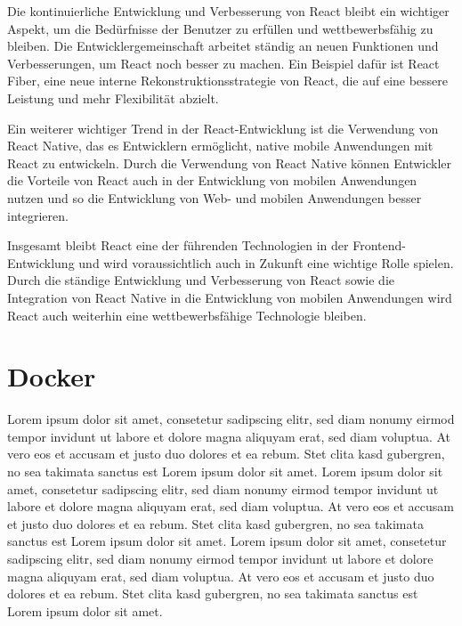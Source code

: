 Die kontinuierliche Entwicklung und Verbesserung von React bleibt ein wichtiger Aspekt, um die Bedürfnisse der Benutzer zu erfüllen und wettbewerbsfähig zu bleiben. Die Entwicklergemeinschaft arbeitet ständig an neuen Funktionen und Verbesserungen, um React noch besser zu machen. Ein Beispiel dafür ist React Fiber, eine neue interne Rekonstruktionsstrategie von React, die auf eine bessere Leistung und mehr Flexibilität abzielt.

Ein weiterer wichtiger Trend in der React-Entwicklung ist die Verwendung von React Native, das es Entwicklern ermöglicht, native mobile Anwendungen mit React zu entwickeln. Durch die Verwendung von React Native können Entwickler die Vorteile von React auch in der Entwicklung von mobilen Anwendungen nutzen und so die Entwicklung von Web- und mobilen Anwendungen besser integrieren.

Insgesamt bleibt React eine der führenden Technologien in der Frontend-Entwicklung und wird voraussichtlich auch in Zukunft eine wichtige Rolle spielen. Durch die ständige Entwicklung und Verbesserung von React sowie die Integration von React Native in die Entwicklung von mobilen Anwendungen wird React auch weiterhin eine wettbewerbsfähige Technologie bleiben.


\section{Docker}

\begin{figure}
\centering
{}
\end{figure}

Lorem ipsum dolor sit amet, consetetur sadipscing elitr, sed diam nonumy eirmod tempor invidunt ut labore et dolore magna aliquyam erat, sed diam voluptua. At vero eos et accusam et justo duo dolores et ea rebum. Stet clita kasd gubergren, no sea takimata sanctus est Lorem ipsum dolor sit amet. Lorem ipsum dolor sit amet, consetetur sadipscing elitr, sed diam nonumy eirmod tempor invidunt ut labore et dolore magna aliquyam erat, sed diam voluptua. At vero eos et accusam et justo duo dolores et ea rebum. Stet clita kasd gubergren, no sea takimata sanctus est Lorem ipsum dolor sit amet. Lorem ipsum dolor sit amet, consetetur sadipscing elitr, sed diam nonumy eirmod tempor invidunt ut labore et dolore magna aliquyam erat, sed diam voluptua. At vero eos et accusam et justo duo dolores et ea rebum. Stet clita kasd gubergren, no sea takimata sanctus est Lorem ipsum dolor sit amet.

